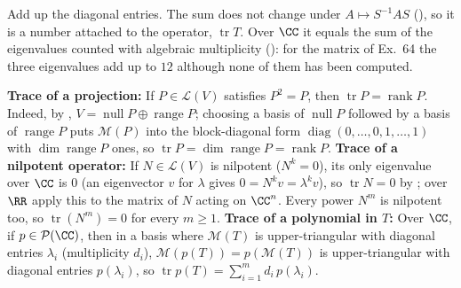 \documentclass[10pt]{scrartcl}
\DeclareMathOperator{\tr}{tr}\DeclareMathOperator{\nul}{null}\DeclareMathOperator{\range}{range}\DeclareMathOperator{\spn}{span}
\newcommand{\LL}{\mathcal L}\newcommand{\PP}{\mathcal P}\newcommand{\MM}{\mathcal M}
\begin{document}
\revisit Add up the diagonal entries. The sum does not change under $A\mapsto S^{-1}AS$ (), so it is a number attached to the operator, $\tr T$. Over $\CC$ it equals the sum of the eigenvalues counted with algebraic multiplicity (): for the matrix of Ex.~64 the three eigenvalues add up to $12$ although none of them has been computed.

\begin{itemize}
  \ii \textbf{Trace of a projection:} If $P\in\LL(V)$ satisfies $P^2=P$, then $\tr P = \operatorname{rank}P$. Indeed, by , $V=\nul P\oplus\range P$; choosing a basis of $\nul P$ followed by a basis of $\range P$ puts $\MM(P)$ into the block-diagonal form $\operatorname{diag}(0,\dots,0,1,\dots,1)$ with $\dim\range P$ ones, so $\tr P=\dim\range P=\operatorname{rank}P$.
  \ii \textbf{Trace of a nilpotent operator:} If $N\in\LL(V)$ is nilpotent ($N^k=0$), its only eigenvalue over $\CC$ is $0$ (an eigenvector $v$ for $\lambda$ gives $0=N^kv=\lambda^kv$), so $\tr N=0$ by ; over $\RR$ apply this to the matrix of $N$ acting on $\CC^n$. Every power $N^m$ is nilpotent too, so $\tr(N^m)=0$ for every $m\ge 1$.
  \ii \textbf{Trace of a polynomial in $T$:} Over $\CC$, if $p\in\PP(\CC)$, then in a basis where $\MM(T)$ is upper-triangular with diagonal entries $\lambda_i$ (multiplicity $d_i$), $\MM(p(T))=p(\MM(T))$ is upper-triangular with diagonal entries $p(\lambda_i)$, so $\tr p(T)=\sum_{i=1}^m d_i\,p(\lambda_i)$.
\end{itemize}
\end{document}
